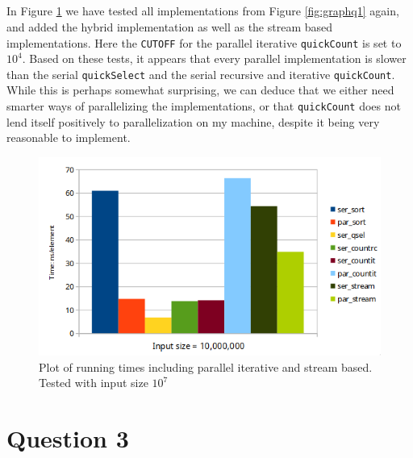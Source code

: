 \documentclass[a5paper]{article}
\begin{document}
\subsection{} 
In Figure \ref{fig:graphq2} we have tested all implementations from Figure \ref{fig:graphq1} again, and added the hybrid implementation as well as the stream based implementations. Here the \texttt{CUTOFF} for the parallel iterative \texttt{quickCount} is set to $10^4$. Based on these tests, it appears that every parallel implementation is slower than the serial \texttt{quickSelect} and the serial recursive and iterative \texttt{quickCount}. While this is perhaps somewhat surprising, we can deduce that we either need smarter ways of parallelizing the implementations, or that \texttt{quickCount} does not lend itself positively to parallelization on my machine, despite it being very reasonable to implement.
\begin{figure}[ht!]
    \centering
    \noindent\includegraphics[scale=0.45]{res/graph_q2.png}
    \caption{Plot of running times including parallel iterative and stream based. Tested with input size $10^7$}
    \label{fig:graphq2}
\end{figure}

\section{Question 3}
\end{document}
